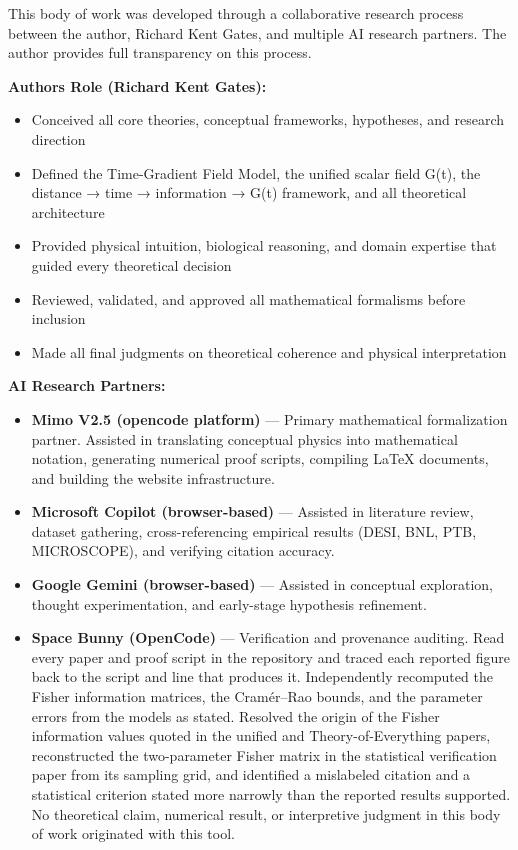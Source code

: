 \documentclass[
  10pt,
]{article}
\providecommand{\tightlist}{%
  \setlength{\itemsep}{0pt}\setlength{\parskip}{0pt}}
\begin{document}
This body of work was developed through a collaborative research process
between the author, Richard Kent Gates, and multiple AI research
partners. The author provides full transparency on this process.

\textbf{Author\textquotesingle s Role (Richard Kent Gates):}

\begin{itemize}
\tightlist
\item
  Conceived all core theories, conceptual frameworks, hypotheses, and
  research direction
\item
  Defined the Time-Gradient Field Model, the unified scalar field G(t),
  the distance → time → information → G(t) framework, and all
  theoretical architecture
\item
  Provided physical intuition, biological reasoning, and domain
  expertise that guided every theoretical decision
\item
  Reviewed, validated, and approved all mathematical formalisms before
  inclusion
\item
  Made all final judgments on theoretical coherence and physical
  interpretation
\end{itemize}

\textbf{AI Research Partners:}

\begin{itemize}
\tightlist
\item
  \textbf{Mimo V2.5 (opencode platform)} --- Primary mathematical
  formalization partner. Assisted in translating conceptual physics into
  mathematical notation, generating numerical proof scripts, compiling
  LaTeX documents, and building the website infrastructure.
\item
  \textbf{Microsoft Copilot (browser-based)} --- Assisted in literature
  review, dataset gathering, cross-referencing empirical results (DESI,
  BNL, PTB, MICROSCOPE), and verifying citation accuracy.
\item
  \textbf{Google Gemini (browser-based)} --- Assisted in conceptual
  exploration, thought experimentation, and early-stage hypothesis
  refinement.
\item
  \textbf{Space Bunny (OpenCode)} --- Verification and provenance
  auditing. Read every paper and proof script in the repository and
  traced each reported figure back to the script and line that produces
  it. Independently recomputed the Fisher information matrices, the
  Cramér--Rao bounds, and the parameter errors from the models as
  stated. Resolved the origin of the Fisher information values quoted in
  the unified and Theory-of-Everything papers, reconstructed the
  two-parameter Fisher matrix in the statistical verification paper from
  its sampling grid, and identified a mislabeled citation and a
  statistical criterion stated more narrowly than the reported results
  supported. No theoretical claim, numerical result, or interpretive
  judgment in this body of work originated with this tool.
\end{itemize}
\end{document}
